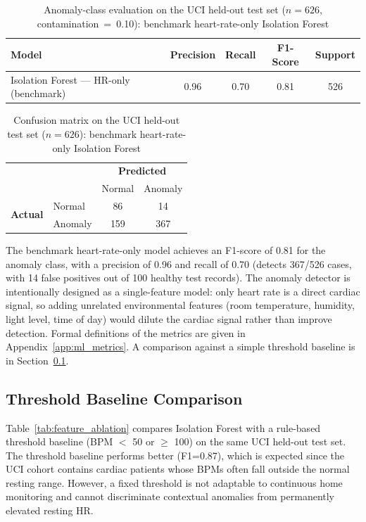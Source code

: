 \begin{table}[H]
\centering
\caption[Anomaly-class evaluation: benchmark HR-only model]{Anomaly-class evaluation on the UCI held-out test set ($n=626$, contamination~=~0.10): benchmark heart-rate-only Isolation Forest}
\label{tab:ml_eval}
\small
\begin{tabular}{lcccc}
\toprule
\textbf{Model}  & \textbf{Precision} & \textbf{Recall} & \textbf{F1-Score} & \textbf{Support} \\
\midrule
Isolation Forest --- HR-only (benchmark)  & 0.96 & 0.70 & 0.81 & 526 \\
\bottomrule
\end{tabular}
\end{table}

\begin{table}[H]
\centering
\caption[Confusion matrix: benchmark HR-only model]{Confusion matrix on the UCI held-out test set ($n=626$): benchmark heart-rate-only Isolation Forest}
\label{tab:confusion}
\small
\centering
\begin{tabular}{llcc}
\toprule
 & & \multicolumn{2}{c}{\textbf{Predicted}} \\
 & & Normal & Anomaly \\
\midrule
\multirow{2}{*}{\textbf{Actual}}
  & Normal  & 86  & 14 \\
  & Anomaly & 159 & 367 \\
\bottomrule
\end{tabular}
\end{table}
\FloatBarrier

The benchmark heart-rate-only model achieves an F1-score of 0.81 for the anomaly class, with a precision of 0.96 and recall of 0.70 (detects 367/526 cases, with 14 false positives out of 100 healthy test records). The anomaly detector is intentionally designed as a single-feature model: only heart rate is a direct cardiac signal, so adding unrelated environmental features (room temperature, humidity, light level, time of day) would dilute the cardiac signal rather than improve detection. Formal definitions of the metrics are given in Appendix~\ref{app:ml_metrics}. A comparison against a simple threshold baseline is in Section~\ref{subsec:ablation}.

\subsection{Threshold Baseline Comparison}
\label{subsec:ablation}

Table~\ref{tab:feature_ablation} compares Isolation Forest with a rule-based threshold baseline (BPM $<$ 50 or $\geq$ 100) on the same UCI held-out test set. The threshold baseline performs better (F1=0.87), which is expected since the UCI cohort contains cardiac patients whose BPMs often fall outside the normal resting range. However, a fixed threshold is not adaptable to continuous home monitoring and cannot discriminate contextual anomalies from permanently elevated resting HR.

